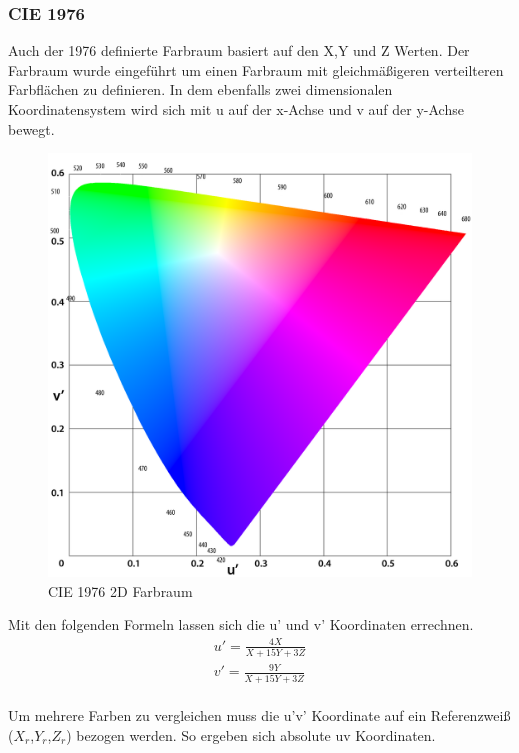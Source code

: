 \documentclass[11pt]{scrartcl}
\begin{document}
\subsubsection{CIE 1976}
Auch der 1976 definierte Farbraum basiert auf den X,Y und Z Werten. Der Farbraum wurde eingeführt um einen Farbraum mit gleichmäßigeren verteilteren Farbflächen zu
definieren. In dem ebenfalls zwei dimensionalen Koordinatensystem wird sich mit u auf der x-Achse und v auf der y-Achse bewegt.
\begin{figure}[H]
    \begin{center}
        \includegraphics[width=.7\textwidth]{images/cie_1976.png}
    \end{center}
    \caption{CIE 1976 2D Farbraum \cite{wikipedia1976}}
\end{figure}
\noindent
Mit den folgenden Formeln lassen sich die u' und v' Koordinaten errechnen.
\begin{align}\label{Equ:9}
    u' = \frac{4X}{X+15Y+3Z}\\
    v' = \frac{9Y}{X+15Y+3Z}
\end{align}
\cite{lindbloom}\\
Um mehrere Farben zu vergleichen muss die u'v' Koordinate auf ein Referenzweiß ($X_r$,$Y_r$,$Z_r$) bezogen werden. So ergeben sich absolute uv Koordinaten.
\end{document}
